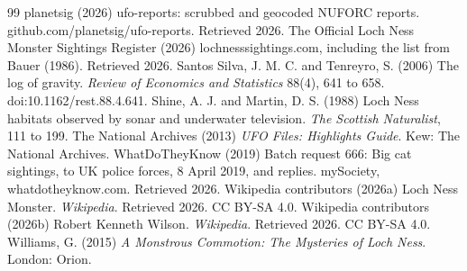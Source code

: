 \documentclass[11pt,a4paper]{article}
\begin{document}
\begin{thebibliography}{99}
 planetsig (2026) ufo-reports: scrubbed and geocoded NUFORC reports. github.com/planetsig/ufo-reports. Retrieved 2026.
 The Official Loch Ness Monster Sightings Register (2026) lochnesssightings.com, including the list from Bauer (1986). Retrieved 2026.
 Santos Silva, J. M. C. and Tenreyro, S. (2006) The log of gravity. \textit{Review of Economics and Statistics} 88(4), 641 to 658. doi:10.1162/rest.88.4.641.
 Shine, A. J. and Martin, D. S. (1988) Loch Ness habitats observed by sonar and underwater television. \textit{The Scottish Naturalist}, 111 to 199.
 The National Archives (2013) \textit{UFO Files: Highlights Guide}. Kew: The National Archives.
 WhatDoTheyKnow (2019) Batch request 666: Big cat sightings, to UK police forces, 8 April 2019, and replies. mySociety, whatdotheyknow.com. Retrieved 2026.
 Wikipedia contributors (2026a) Loch Ness Monster. \textit{Wikipedia}. Retrieved 2026. CC BY-SA 4.0.
 Wikipedia contributors (2026b) Robert Kenneth Wilson. \textit{Wikipedia}. Retrieved 2026. CC BY-SA 4.0.
 Williams, G. (2015) \textit{A Monstrous Commotion: The Mysteries of Loch Ness}. London: Orion.
\end{thebibliography}

\appendix
\end{document}
